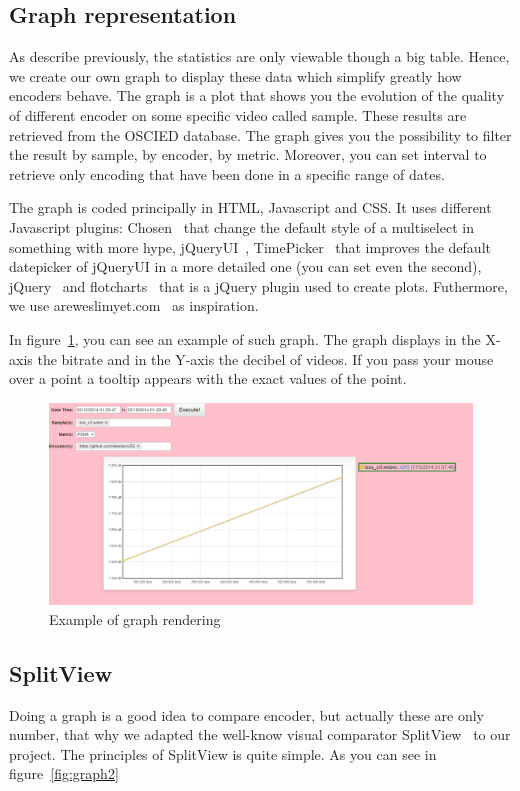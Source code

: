 \documentclass[a4paper,12pt]{article}
\begin{document}
\subsection{Graph representation} As describe previously, the statistics are
only viewable though a big table. Hence, we create our own graph to display
these data which simplify greatly how encoders behave. The graph is a plot that
shows you the evolution of the quality of different encoder on some specific
video called sample. These results are retrieved from the OSCIED database. The
graph gives you the possibility to filter the result by sample, by encoder, by
metric. Moreover, you can set interval to retrieve only encoding that have been
done in a specific range of dates.
     
The graph is coded principally in HTML, Javascript and CSS. It uses different
Javascript plugins: Chosen~\cite{harvesthq_chosen}
that change the default style of a multiselect in something with more hype,
jQueryUI~\cite{jqueryui},
TimePicker~\cite{timepicker} that
improves the default datepicker of jQueryUI in a more detailed one (you can set
even the second), jQuery~\cite{jquery} and
flotcharts~\cite{flotchart} that is a jQuery plugin
used to create plots. Futhermore, we use
areweslimyet.com~\cite{areweslimyet} as inspiration.
     
In figure~\ref{fig:graph1}, you can see an example of such graph. The graph
displays in the X-axis the bitrate and in the Y-axis the decibel of videos. If
you pass your mouse over a point a tooltip appears with the exact values of the
point.
     
\begin{figure}[!h] \centering
  \includegraphics[width=1\textwidth]{figures/graph1.png}
  \caption{Example of graph rendering}
  \label{fig:graph1}
\end{figure}
     
\subsection{SplitView} Doing a graph is a good idea to compare encoder, but
actually these are only number, that why we adapted the well-know visual
comparator SplitView~\cite{splitview} to our
project. The principles of SplitView is quite simple. As you can see in
figure~\ref{fig:graph2}
     
\end{document}
